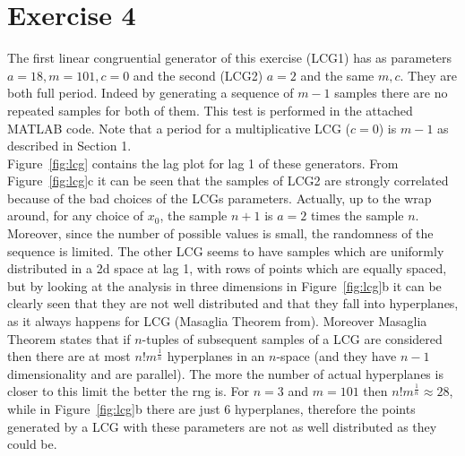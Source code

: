 \documentclass[10pt]{article}
\begin{document}
\section{Exercise 4}
The first linear congruential generator of this exercise (LCG1) has as parameters $a = 18, m = 101, c = 0$ and the second (LCG2) $a = 2$ and the same $m, c$. They are both full period. Indeed by generating a sequence of $m-1$ samples there are no repeated samples for both of them. This test is performed in the attached MATLAB code. Note that a period for a multiplicative LCG ($c = 0$) is $m-1$ as described in Section 1.\\
Figure~\ref{fig:lcg} contains the lag plot for lag 1 of these generators. From Figure~\ref{fig:lcg}c it can be seen that the samples of LCG2 are strongly correlated because of the bad choices of the LCGs parameters. Actually, up to the wrap around, for any choice of $x_0$, the sample $n+1$ is $a = 2$ times the sample $n$. Moreover, since the number of possible values is small, the randomness of the sequence is limited. The other LCG seems to have samples which are uniformly distributed in a 2d space at lag 1, with rows of points which are equally spaced, but by looking at the analysis in three dimensions in Figure~\ref{fig:lcg}b it can be clearly seen that they are not well distributed and that they fall into hyperplanes, as it always happens for LCG (Masaglia Theorem from\cite{masaglia}). Moreover Masaglia Theorem states that if $n$-tuples of subsequent samples of a LCG are considered then there are at most $n!m^{\frac{1}{n}}$ hyperplanes in an $n$-space (and they have $n-1$ dimensionality and are parallel). The more the number of actual hyperplanes is closer to this limit the better the rng is. For $n=3$ and $m=101$ then $n!m^{\frac{1}{n}} \approx 28$, while in Figure~\ref{fig:lcg}b there are just 6 hyperplanes, therefore the points generated by a LCG with these parameters are not as well distributed as they could be.
\end{document}
